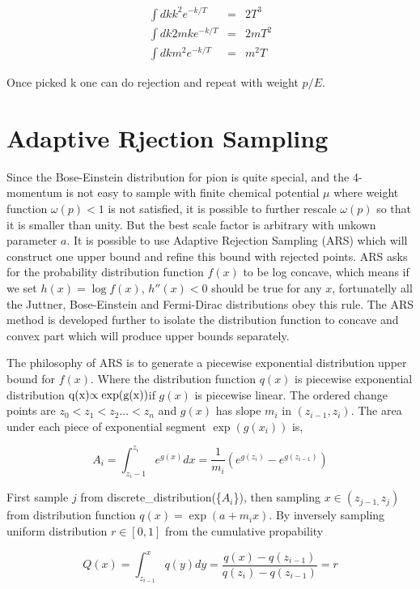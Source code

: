 \documentclass[11pt, oneside]{article}   	%
\begin{document}
\begin{eqnarray}
\int dkk^{2}e^{-k/T} & = & 2T^{3}\\
\int dk2mke^{-k/T} & = & 2mT^{2}\\
\int dkm^{2}e^{-k/T} & = & m^{2}T
\end{eqnarray}


Once picked k one can do rejection and repeat with weight $p/E$. 

\section{Adaptive Rjection Sampling}

Since the Bose-Einstein distribution for pion is quite special, and
the 4-momentum is not easy to sample with finite chemical potential
$\mu$ where weight function $\omega(p)<1$ is not satisfied, it is
possible to further rescale $\omega(p)$ so that it is smaller than
unity. But the best scale factor is arbitrary with unkown parameter
$a$. It is possible to use Adaptive Rejection Sampling (ARS) which
will construct one upper bound and refine this bound with rejected
points. ARS asks for the probability distribution function $f(x)$
to be log concave, which means if we set $h(x)=\log f(x)$, $h''(x)<0$
should be true for any $x$, fortunatelly all the Juttner, Bose-Einstein
and Fermi-Dirac distributions obey this rule. The ARS method is developed
further to isolate the distribution function to concave and convex
part which will produce upper bounds separately. 

The philosophy of ARS is to generate a piecewise exponential distribution
upper bound for $f(x)$. Where the distribution function $q(x)$ is
piecewise exponential distribution $\mbox{q(x)\ensuremath{\propto\exp}(g(x))}$if
$g(x)$ is piecewise linear. The ordered change points are $z_{0}<z_{1}<z_{2}...<z_{n}$
and $g(x)$ has slope $m_{i}$ in $(z_{i-1},z_{i})$. The area under
each piece of exponential segment $\exp(g(x_{i}))$ is,

\[
A_{i}=\int_{z_{i}-1}^{z_{i}}e^{g(x)}dx=\frac{1}{m_{i}}\left(e^{g(z_{i})}-e^{g(z_{i-1})}\right)
\]


First sample $j$ from discrete\_distribution(\{$A_{i}$\}), then
sampling $x\in(z_{j-1,}z_{j})$ from distribution function $q(x)=\exp(a+m_{i}x)$.
By inversely sampling uniform distribution $r\in[0,1]$ from the cumulative
propability 

\[
Q(x)=\int_{z_{i-1}}^{x}q(y)dy=\frac{q(x)-q(z_{i-1})}{q(z_{i})-q(z_{i-1})}=r
\]
\end{document}
